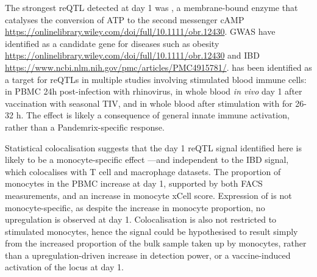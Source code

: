 The strongest \gls{reQTL} detected at day 1 was , a membrane-bound enzyme that catalyses the conversion of ATP to the second messenger cAMP \url{https://onlinelibrary.wiley.com/doi/full/10.1111/obr.12430}.
\gls{GWAS} have identified  as a candidate gene for diseases such as obesity \url{https://onlinelibrary.wiley.com/doi/full/10.1111/obr.12430} and IBD \url{https://www.ncbi.nlm.nih.gov/pmc/articles/PMC4915781/}.
%
 has been identified as a target for reQTLs in multiple studies involving stimulated blood immune cells:
in \gls{PBMC} 24h post-infection with rhinovirus\autocite{caliskan2015HostGeneticVariation},
in whole blood \textit{in vivo} day 1 after vaccination with seasonal \gls{TIV}\autocite{franco2013IntegrativeGenomicAnalysis},
and in whole blood after stimulation with  for 26-32 h\autocite{manry2017DecipheringGeneticControl}.
The effect is likely a consequence of general innate immune activation, rather than a Pandemrix-specific response.

Statistical colocalisation suggests that the day 1 reQTL signal identified here is likely to be a monocyte-specific effect
---and independent to the IBD signal, which colocalises with T cell and macrophage datasets.
The proportion of monocytes in the PBMC increase at day 1, supported by both FACS\autocite{sobolev2016AdjuvantedInfluenzaH1N1Vaccination} measurements, and an increase in monocyte xCell score.
Expression of  is not monocyte-specific, as despite the increase in monocyte proportion, no upregulation is observed at day 1.
Colocalisation is also not restricted to stimulated monocytes,
hence the signal could be hypothesised to result simply from the increased proportion of the bulk sample taken up by monocytes,
rather than a upregulation-driven increase in detection power,
or a vaccine-induced activation of the locus at day 1.


